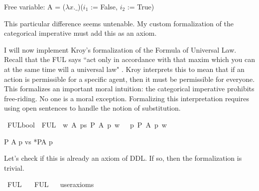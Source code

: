 \begin{isabellebody}
{  Free variable:
    A = ($\lambda x. \_$)($i_1$ := False, $i_2$ := True)\color{black}%
}%
\endisatagproof
{\isafoldproof}%
%
\isadelimproof
%
\endisadelimproof
%
\begin{isamarkuptext}%
This particular difference seems untenable. My custom formalization of the categorical imperative 
must add this as an axiom.%
\end{isamarkuptext}\isamarkuptrue%
%
\isadelimdocument
%
\endisadelimdocument
%
\isatagdocument
%
\isamarkuptrue%
%
\endisatagdocument
{\isafolddocument}%
%
\isadelimdocument
%
\endisadelimdocument
%
\begin{isamarkuptext}%
I will now implement Kroy's formalization of the Formula of Universal Law. Recall that the FUL says
``act only in accordance with that maxim which you can at the same time will a universal law" \cite{groundwork}.
Kroy interprets this to mean that if an action is permissible for a specific agent, then it must be permissible for everyone.
This formalizes an important moral intuition: the categorical imperative prohibits free-riding. No one is a moral exception.
Formalizing this interpretation requires using open sentences to handle the notion of substitution.%
\end{isamarkuptext}\isamarkuptrue%
\isamarkupfalse%
\ FUL{\isacharcolon}{\isacharcolon}{\isachardoublequoteopen}bool{\isachardoublequoteclose}\ \ {\isachardoublequoteopen}FUL\ {\isasymequiv}\ {\isasymforall}w\ A{\isachardot}\ {\isacharparenleft}{\isacharparenleft}{\isasymexists}p{\isacharcolon}{\isacharcolon}s{\isachardot}\ {\isacharparenleft}{\isacharparenleft}P\ {\isacharbraceleft}A\ p{\isacharbraceright}{\isacharparenright}\ w{\isacharparenright}{\isacharparenright}\ \ {\isasymlongrightarrow}{\isacharparenleft}\ {\isacharparenleft}{\isasymforall}p{\isachardot}{\isacharparenleft}\ P\ {\isacharbraceleft}A\ p{\isacharbraceright}{\isacharparenright}\ w{\isacharparenright}{\isacharparenright}{\isacharparenright}\ {\isachardoublequoteclose}%
\begin{isamarkuptext}%
P {A p} vs *P{A} p%
\end{isamarkuptext}\isamarkuptrue%
%
%
\begin{isamarkuptext}%
Let's check if this is already an axiom of DDL. If so, then the formalization is trivial.%
\end{isamarkuptext}\isamarkuptrue%
\isamarkupfalse%
\ FUL{\isacharcolon}\isanewline
\ \ \ FUL\isanewline
\ \ \isamarkupfalse%
{\isacharbrackleft}user{\isacharunderscore}axioms{\isacharbrackright}%
\isadelimproof
\ %
\endisadelimproof
%
\isatagproof
{}\isamarkupfalse%
\isanewline
%
\end{isabellebody}

